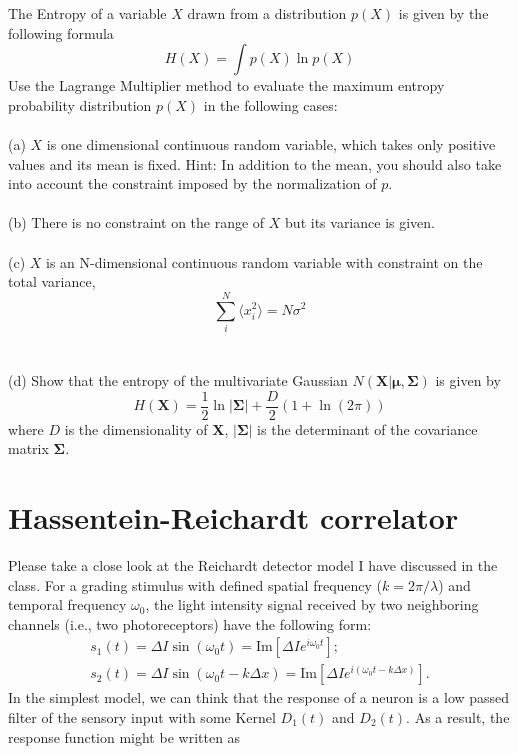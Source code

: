 \documentclass{article}
\begin{document}
The Entropy of a variable $X$ drawn from a distribution $p(X)$ is given by the following formula
\begin{equation}
H(X) =\int p(X) \ln p(X)
\end{equation}
Use the Lagrange Multiplier method to evaluate the maximum entropy probability distribution $p(X)$ in the following cases:
\\
\\
(a) $X$ is one dimensional continuous random variable, which takes only positive values and its mean is fixed. Hint: In addition to the mean, you should also take into account the
 constraint imposed by the normalization of $p$.
 \\
 \\
 (b) There is no constraint on the range of $X$ but its variance is given.
 \\
 \\
 (c) $X$ is an N-dimensional continuous random variable with constraint on the total variance,
 \begin{equation}
 \sum_i^N \langle x_i^2 \rangle = N\sigma^2
 \end{equation}
\\
\\
(d) Show that the entropy of the multivariate Gaussian $N(\mathbf{X}|\mathbf{\mu},\mathbf{\Sigma})$ is given by
\begin{equation}
H(\mathbf{X}) = \frac{1}{2}\ln |\mathbf{\Sigma}| + \frac{D}{2}(1+\ln(2\pi))
\end{equation}
where $D$ is the dimensionality of $\mathbf{X}$,  $|\mathbf{\Sigma}|$ is the determinant of the covariance matrix $\mathbf{\Sigma}$. 

\section*{Hassentein-Reichardt correlator}

Please take a close look at the Reichardt detector model I have discussed in the class. For a grading stimulus with defined spatial frequency ($k =2\pi /\lambda$) and temporal frequency $\omega_0$, the light intensity signal received by two neighboring  channels (i.e., two photoreceptors) have the following form:
\begin{equation}
\begin{aligned}
s_1(t) = \Delta I \sin(\omega_0 t)= \textrm{Im}\left [ \Delta I e^{i\omega_0 t}\right];  \\
s_2(t) = \Delta I \sin(\omega_0 t -k \Delta x)= \textrm{Im} \left [ \Delta I e^{i(\omega_0 t- k\Delta x)}\right].
\end{aligned}
\end{equation}
In the simplest model, we can think that the response of a neuron is a low passed filter of the sensory input with some Kernel $D_1(t)$ and $D_2(t)$. As a result, the response function might be written as 
\end{document}
